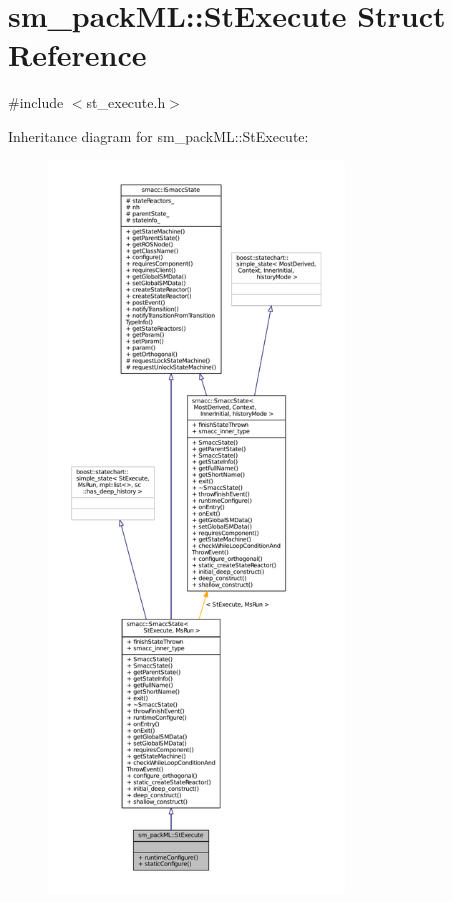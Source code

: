 \hypertarget{structsm__packML_1_1StExecute}{}\section{sm\+\_\+pack\+ML\+:\+:St\+Execute Struct Reference}
\label{structsm__packML_1_1StExecute}


{\ttfamily \#include $<$st\+\_\+execute.\+h$>$}



Inheritance diagram for sm\+\_\+pack\+ML\+:\+:St\+Execute\+:
\nopagebreak
\begin{figure}[H]
\begin{center}
\leavevmode
\includegraphics[height=550pt]{structsm__packML_1_1StExecute__inherit__graph}
\end{center}
\end{figure}


